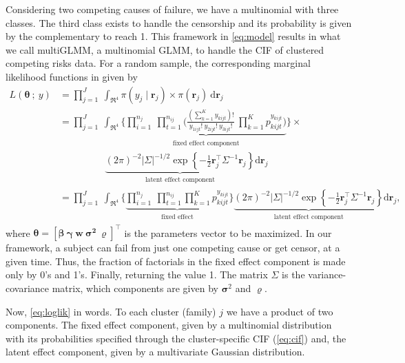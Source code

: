 Considering two competing causes of failure, we have a multinomial with
three classes. The third class exists to handle the censorship and its
probability is given by the complementary to reach 1. This framework in
\autoref{eq:model} results in what we call multiGLMM, a multinomial
GLMM, to handle the CIF of clustered competing risks data. For a random
sample, the corresponding marginal likelihood functions in given by
\begin{align}
  L(\bm{\theta}~;~y)
  &= \prod_{j=1}^{J}~\int_{\Re^{4}}
    \pi(y_{j} \mid \bm{r}_{j})\times\pi(\bm{r}_{j})~\text{d}\bm{r}_{j}
    \nonumber\\
  &= \prod_{j=1}^{J}~\int_{\Re^{4}}
    \Bigg\{
    \underbrace{\prod_{i=1}^{n_{j}}~\prod_{t=1}^{n_{ij}}
    \Bigg(
    \frac{(\sum_{k=1}^{K}y_{kijt})!}{y_{1ijt}!~y_{2ijt}!~y_{3ijt}!}~
    \prod_{k=1}^{K} p_{kijt}^{y_{kijt}}
    \Bigg)}_{\substack{\text{fixed effect component}}}
  \Bigg\}\times\nonumber\\
  &\hspace{2cm}\underbrace{
    (2\pi)^{-2} |\Sigma|^{-1/2} \exp
    \left\{-\frac{1}{2}\bm{r}_{j}^{\top} \Sigma^{-1} \bm{r}_{j}\right\}
    }_{\substack{\text{latent effect component}}}
    \text{d}\bm{r}_{j}\nonumber\\
  &= \prod_{j=1}^{J}~\int_{\Re^{4}}
    \Bigg\{
    \underbrace{\prod_{i=1}^{n_{j}}~\prod_{t=1}^{n_{ij}}
    \prod_{k=1}^{K} p_{kijt}^{y_{kijt}}
    }_{\substack{\text{fixed effect}}}
  \Bigg\}\underbrace{
  (2\pi)^{-2} |\Sigma|^{-1/2} \exp
  \left\{-\frac{1}{2}\bm{r}_{j}^{\top} \Sigma^{-1} \bm{r}_{j}\right\}
  }_{\substack{\text{latent effect component}}}
  \text{d}\bm{r}_{j}\label{eq:loglik},
\end{align}
where \(\bm{\theta} = [\bm{\beta}~\bm{\gamma}~\bm{w}~\bm{\sigma^{2}}~
\bm{\varrho}]^{\top}\) is the parameters vector to be maximized. In our
framework, a subject can fail from just one competing cause or get
censor, at a given time. Thus, the fraction of factorials in the fixed
effect component is made only by 0's and 1's. Finally, returning the
value 1. The matrix \(\Sigma\) is the variance-covariance matrix, which
components are given by \(\bm{\sigma}^{2}\) and \(\bm{\varrho}\).

Now, \autoref{eq:loglik} in words. To each cluster (family) \(j\) we
have a product of two components. The fixed effect component, given by a
multinomial distribution with its probabilities specified through the
cluster-specific CIF (\autoref{eq:cif}) and, the latent effect
component, given by a multivariate Gaussian distribution.

